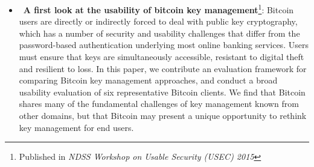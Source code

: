 \begin{itemize}
    \item{~\textbf{A first look at the usability of bitcoin key management}\footnote{Published in \textit{NDSS Workshop on Usable Security (USEC) 2015}}}: Bitcoin users are directly or indirectly forced to deal with public key cryptography, which has a number of security and usability challenges that differ from the password-based authentication underlying most online banking services. Users must ensure that keys are simultaneously accessible, resistant to digital theft and resilient to loss. In this paper, we contribute an evaluation framework for comparing Bitcoin key management approaches, and conduct a broad usability evaluation of six representative Bitcoin clients. We find that Bitcoin shares many of the fundamental challenges of key management known from other domains, but that Bitcoin may present a unique opportunity to rethink key management for end users.

\end{itemize}

